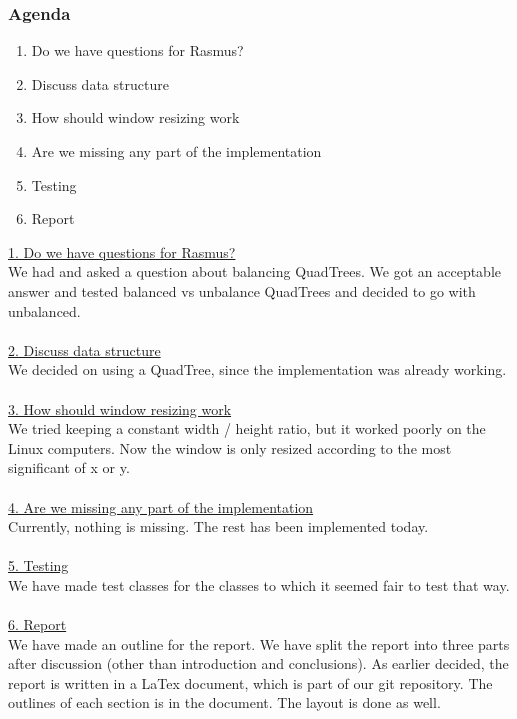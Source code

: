 \documentclass[a4paper,11pt]{article}
\begin{document}
\subsubsection*{Agenda}
\begin{enumerate}
	\item Do we have questions for Rasmus?
	\item Discuss data structure
	\item How should window resizing work
	\item Are we missing any part of the implementation
	\item Testing
	\item Report
\end{enumerate}
\underline{1. Do we have questions for Rasmus?} \\
We had and asked a question about balancing QuadTrees. We got an acceptable answer and tested balanced vs unbalance QuadTrees and decided to go with unbalanced. \\ \\
\underline{2. Discuss data structure} \\
We decided on using a QuadTree, since the implementation was already working. \\ \\
\underline{3. How should window resizing work} \\
We tried keeping a constant width / height ratio, but it worked poorly on the Linux computers. Now the window is only resized according to the most significant of x or y. \\ \\
\underline{4. Are we missing any part of the implementation} \\
Currently, nothing is missing. The rest has been implemented today. \\ \\
\underline{5. Testing} \\
We have made test classes for the classes to which it seemed fair to test that way. \\ \\
\underline{6. Report} \\
We have made an outline for the report. We have split the report into three parts after discussion (other than introduction and conclusions). As earlier decided, the report is written in a LaTex document, which is part of our git repository. The outlines of each section is in the document. The layout is done as well. \\ \\
\end{document}
